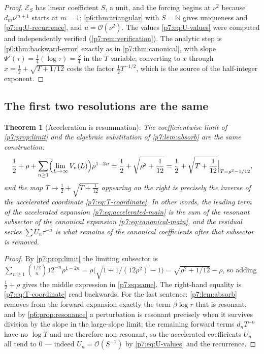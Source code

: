 \documentclass[11pt,a4paper,oneside]{book}
\theoremstyle{plain}
\newtheorem{theorem}{Theorem}[chapter]
\theoremstyle{definition}
\theoremstyle{remark}
\newcommand{\Nat}{\mathbb{N}}
\newcommand{\bigO}{\mathcal{O}}
\begin{document}
\begin{proof}
$\mathcal{E}_S$ has linear coefficient $S$, a unit, and the forcing begins at
$\nu^{2}$ because $d_m\nu^{m+1}$ starts at $m=1$; \cref{p6:thm:triangular}
with $S=\Nat$ gives uniqueness and \eqref{p7:eq:U-recurrence}, and
$u=\bigO(\nu^{2})$.  The values \eqref{p7:eq:U-values} were computed and
independently verified (\cref{p7:rem:verification}).  The analytic step is
\cref{p0:thm:backward-error} exactly as in \cref{p7:thm:canonical}, with slope
$\Psi'(\tau)=\tfrac14(\log\tau)=\tfrac S4$ in the $T$ variable; converting to
$x$ through $x=\tfrac12+\sqrt{T+1/12}$ costs the factor $\tfrac12T^{-1/2}$,
which is the source of the half-integer exponent.
\end{proof}

\subsection{The first two resolutions are the same}

\begin{theorem}[Acceleration is resummation]\label{p7:thm:acceleration-is-resummation}
The coefficientwise limit of \cref{p7:prop:limit} and the algebraic
substitution of \cref{p7:lem:absorb} are the same construction:
\begin{equation}\label{p7:eq:same}
 \frac12+\rho+\sum_{n\ge1}\Bigl(\lim_{L\to\infty}V_n(L)\Bigr)\rho^{1-2n}
 =\frac12+\sqrt{\rho^{2}+\frac1{12}}
 =\frac12+\sqrt{T+\frac1{12}}\Big|_{T=\rho^{2}-1/12}^{\phantom{.}}
 ,
\end{equation}
and the map $T\mapsto\tfrac12+\sqrt{T+\tfrac1{12}}$ appearing on the right is
precisely the inverse of the accelerated coordinate
\eqref{p7:eq:T-coordinate}.  In other words, the leading term of the
accelerated expansion \eqref{p7:eq:accelerated-main} \emph{is} the sum of the
resonant subsector of the canonical expansion \eqref{p7:eq:canonical-main},
and the residual series $\sum U_n\tau^{-n}$ is what remains of the canonical
coefficients after that subsector is removed.
\end{theorem}

\begin{proof}
By \cref{p7:prop:limit} the limiting subsector is
$\sum_{n\ge1}\binom{1/2}{n}12^{-n}\rho^{1-2n}
=\rho\bigl(\sqrt{1+1/(12\rho^{2})}-1\bigr)=\sqrt{\rho^{2}+1/12}-\rho$, so
adding $\tfrac12+\rho$ gives the middle expression in \eqref{p7:eq:same}.  The
right-hand equality is \eqref{p7:eq:T-coordinate} read backwards.  For the
last sentence: \cref{p7:lem:absorb} removes from the forward expansion exactly
the term $\beta\log r$ that is resonant, and by
\cref{p6:prop:resonance} a perturbation is resonant precisely when it survives
division by the slope in the large-slope limit; the remaining forward terms
$d_n T^{-n}$ have no $\log T$ and are therefore non-resonant, so the
accelerated coefficients $U_n$ all tend to $0$ --- indeed
$U_n=\bigO(S^{-1})$ by \eqref{p7:eq:U-values} and the recurrence.
\end{proof}
\end{document}
